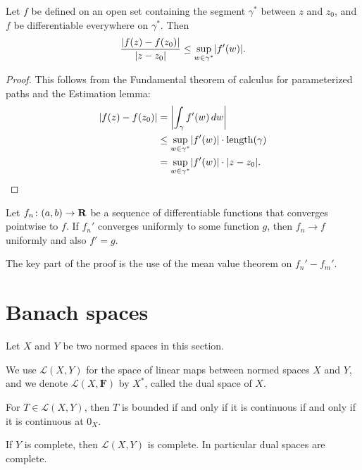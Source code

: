 \begin{namedthm}
    Let $f$ be defined on an open set containing the segment $\gamma^*$ between $z$ and $z_0$, and $f$ be differentiable everywhere on $\gamma^*$. Then \[
        \frac{\lvert f(z) - f(z_0) \rvert}{\lvert z - z_0 \rvert} \leq \sup_{w\in \gamma^*}\lvert f'(w) \rvert.
    \]
\end{namedthm}
\begin{proof}
    This follows from the Fundamental theorem of calculus for parameterized paths and the Estimation lemma: \begin{align*}
         \lvert f(z) - f(z_0) \rvert & = \biggl\vert \int_\gamma f'(w)\,dw\biggr\vert \\ & \leq \sup_{w\in \gamma^*} \lvert f'(w) \rvert\cdot \operatorname{length}(\gamma) \\ & = \sup_{w\in \gamma^*} \lvert f'(w) \rvert\cdot \lvert z - z_0 \rvert. \qedhere
    \end{align*}
\end{proof}

\begin{namedthm}
    Let $f_n \colon (a,b)\to \mathbf{R}$ be a sequence of differentiable functions that converges pointwise to $f$. If $f_n'$ converges uniformly to some function $g$, then $f_n\to f$ uniformly and also $f' = g$.
\end{namedthm}
The key part of the proof is the use of the mean value theorem on $f_n' - f_m'$. 

\section{Banach spaces}
Let $X$ and $Y$ be two normed spaces in this section.

We use $\mathcal{L}(X,Y)$ for the space of linear maps between normed spaces $X$ and $Y$, and we denote $\mathcal L(X,\mathbf F)$ by $X^*$, called the dual space of $X$.
\begin{prop}
    For $T \in \mathcal{L}(X,Y)$, then $T$ is bounded if and only if it is continuous if and only if it is continuous at $0_X$.
\end{prop}

\begin{prop}
    If $Y$ is complete, then $\mathcal{L}(X,Y)$ is complete. In particular dual spaces are complete.
\end{prop}

